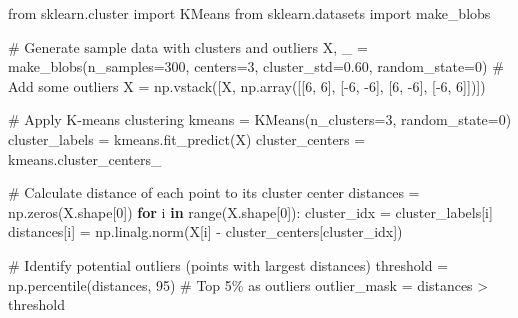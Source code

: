 \documentclass[
  letterpaper,
  DIV=11,
  numbers=noendperiod]{scrreprt}
\newenvironment{Shaded}{\begin{snugshade}}{\end{snugshade}}
\newcommand{\BuiltInTok}[1]{\textcolor[rgb]{0.00,0.23,0.31}{#1}}
\newcommand{\CommentTok}[1]{\textcolor[rgb]{0.37,0.37,0.37}{#1}}
\newcommand{\ControlFlowTok}[1]{\textcolor[rgb]{0.00,0.23,0.31}{\textbf{#1}}}
\newcommand{\DecValTok}[1]{\textcolor[rgb]{0.68,0.00,0.00}{#1}}
\newcommand{\FloatTok}[1]{\textcolor[rgb]{0.68,0.00,0.00}{#1}}
\newcommand{\ImportTok}[1]{\textcolor[rgb]{0.00,0.46,0.62}{#1}}
\newcommand{\KeywordTok}[1]{\textcolor[rgb]{0.00,0.23,0.31}{\textbf{#1}}}
\newcommand{\NormalTok}[1]{\textcolor[rgb]{0.00,0.23,0.31}{#1}}
\newcommand{\OperatorTok}[1]{\textcolor[rgb]{0.37,0.37,0.37}{#1}}
\begin{document}
\begin{Shaded}
\begin{Highlighting}[]
\ImportTok{from}\NormalTok{ sklearn.cluster }\ImportTok{import}\NormalTok{ KMeans}
\ImportTok{from}\NormalTok{ sklearn.datasets }\ImportTok{import}\NormalTok{ make\_blobs}

\CommentTok{\# Generate sample data with clusters and outliers}
\NormalTok{X, \_ }\OperatorTok{=}\NormalTok{ make\_blobs(n\_samples}\OperatorTok{=}\DecValTok{300}\NormalTok{, centers}\OperatorTok{=}\DecValTok{3}\NormalTok{, cluster\_std}\OperatorTok{=}\FloatTok{0.60}\NormalTok{, random\_state}\OperatorTok{=}\DecValTok{0}\NormalTok{)}
\CommentTok{\# Add some outliers}
\NormalTok{X }\OperatorTok{=}\NormalTok{ np.vstack([X, np.array([[}\DecValTok{6}\NormalTok{, }\DecValTok{6}\NormalTok{], [}\OperatorTok{{-}}\DecValTok{6}\NormalTok{, }\OperatorTok{{-}}\DecValTok{6}\NormalTok{], [}\DecValTok{6}\NormalTok{, }\OperatorTok{{-}}\DecValTok{6}\NormalTok{], [}\OperatorTok{{-}}\DecValTok{6}\NormalTok{, }\DecValTok{6}\NormalTok{]])])}

\CommentTok{\# Apply K{-}means clustering}
\NormalTok{kmeans }\OperatorTok{=}\NormalTok{ KMeans(n\_clusters}\OperatorTok{=}\DecValTok{3}\NormalTok{, random\_state}\OperatorTok{=}\DecValTok{0}\NormalTok{)}
\NormalTok{cluster\_labels }\OperatorTok{=}\NormalTok{ kmeans.fit\_predict(X)}
\NormalTok{cluster\_centers }\OperatorTok{=}\NormalTok{ kmeans.cluster\_centers\_}

\CommentTok{\# Calculate distance of each point to its cluster center}
\NormalTok{distances }\OperatorTok{=}\NormalTok{ np.zeros(X.shape[}\DecValTok{0}\NormalTok{])}
\ControlFlowTok{for}\NormalTok{ i }\KeywordTok{in} \BuiltInTok{range}\NormalTok{(X.shape[}\DecValTok{0}\NormalTok{]):}
\NormalTok{    cluster\_idx }\OperatorTok{=}\NormalTok{ cluster\_labels[i]}
\NormalTok{    distances[i] }\OperatorTok{=}\NormalTok{ np.linalg.norm(X[i] }\OperatorTok{{-}}\NormalTok{ cluster\_centers[cluster\_idx])}

\CommentTok{\# Identify potential outliers (points with largest distances)}
\NormalTok{threshold }\OperatorTok{=}\NormalTok{ np.percentile(distances, }\DecValTok{95}\NormalTok{)  }\CommentTok{\# Top 5\% as outliers}
\NormalTok{outlier\_mask }\OperatorTok{=}\NormalTok{ distances }\OperatorTok{\textgreater{}}\NormalTok{ threshold}


\end{Highlighting}
\end{Shaded}
\end{document}
